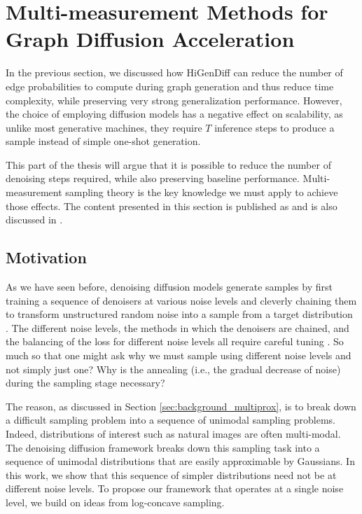 \section{Multi-measurement Methods for Graph Diffusion Acceleration}
\label{sec: multiprox}

In the previous section, we discussed how HiGenDiff can reduce the number of edge probabilities to compute during graph generation and thus reduce time complexity, while preserving very strong generalization performance. However, the choice of employing diffusion models has a negative effect on scalability, as unlike most generative machines, they require $T$ inference steps to produce a sample instead of simple one-shot generation.

This part of the thesis will argue that it is possible to reduce the number of denoising steps required, while also preserving baseline performance. Multi-measurement sampling theory is the key knowledge we must apply to achieve those effects. The content presented in this section is published as \cite{dadi_improving_2025} and is also discussed in \cite{dadi_noisy_2025}.

\subsection{Motivation}

As we have seen before, denoising diffusion models generate samples by first training a sequence of denoisers at various noise levels and cleverly chaining them to transform unstructured random noise into a sample from a target distribution \cite{ho_denoising_2020, dhariwal_diffusion_2021}. The different noise levels, the methods in which the denoisers are chained, and the balancing of the loss for different noise levels all require careful tuning \cite{karras_elucidating_2022}. So much so that one might ask why we must sample using different noise levels and not simply just one? Why is the annealing (i.e., the gradual decrease of noise) during the sampling stage necessary? 

The reason, as discussed in Section \ref{sec:background_multiprox}, is to break down a difficult sampling problem into a sequence of unimodal sampling problems. Indeed, distributions of interest such as natural images are often multi-modal. The denoising diffusion framework breaks down this sampling task into a sequence of unimodal distributions that are easily approximable by Gaussians. In this work, we show that this sequence of simpler distributions need not be at different noise levels. To propose our framework that operates at a single noise level, we build on ideas from log-concave sampling.

